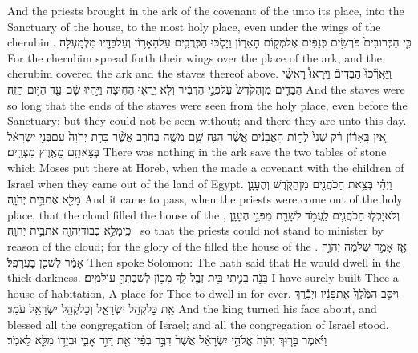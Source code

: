 {And the priests brought in the ark of the covenant of the \lord\space unto its place, into the Sanctuary of the house, to the most holy place, even under the wings of the cherubim.}
{כִּ֤י הַכְּרוּבִים֙ פֹּרְשִׂ֣ים כְּנָפַ֔יִם אֶל\maqqaf מְק֖וֹם הָאָר֑וֹן וַיָּסֹ֧כּוּ הַכְּרֻבִ֛ים עַל\maqqaf הָאָר֥וֹן וְעַל\maqqaf בַּדָּ֖יו מִלְמָֽעְלָה׃}
{For the cherubim spread forth their wings over the place of the ark, and the cherubim covered the ark and the staves thereof above.}
{וַֽיַּאֲרִ֘כוּ֮ הַבַּדִּים֒ וַיֵּֽרָאוּ֩ רָאשֵׁ֨י הַבַּדִּ֤ים מִן\maqqaf הַקֹּ֙דֶשׁ֙ עַל\maqqaf פְּנֵ֣י הַדְּבִ֔יר וְלֹ֥א יֵרָא֖וּ הַח֑וּצָה וַיִּ֣הְיוּ שָׁ֔ם עַ֖ד הַיּ֥וֹם הַזֶּֽה׃}
{And the staves were so long that the ends of the staves were seen from the holy place, even before the Sanctuary; but they could not be seen without; and there they are unto this day.}
{אֵ֚ין בָּֽאָר֔וֹן רַ֗ק שְׁנֵי֙ לֻח֣וֹת הָאֲבָנִ֔ים אֲשֶׁ֨ר הִנִּ֥חַ שָׁ֛ם מֹשֶׁ֖ה בְּחֹרֵ֑ב אֲשֶׁ֨ר כָּרַ֤ת יְהֹוָה֙ עִם\maqqaf בְּנֵ֣י יִשְׂרָאֵ֔ל בְּצֵאתָ֖ם מֵאֶ֥רֶץ מִצְרָֽיִם׃}
{There was nothing in the ark save the two tables of stone which Moses put there at Horeb, when the \lord\space made a covenant with the children of Israel when they came out of the land of Egypt.}
{וַיְהִ֕י בְּצֵ֥את הַכֹּהֲנִ֖ים מִן\maqqaf הַקֹּ֑דֶשׁ וְהֶעָנָ֥ן מָלֵ֖א אֶת\maqqaf בֵּ֥ית יְהֹוָֽה׃}
{And it came to pass, when the priests were come out of the holy place, that the cloud filled the house of the \lord,}
{וְלֹא\maqqaf יָכְל֧וּ הַכֹּהֲנִ֛ים לַֽעֲמֹ֥ד לְשָׁרֵ֖ת מִפְּנֵ֣י הֶעָנָ֑ן כִּֽי\maqqaf מָלֵ֥א כְבוֹד\maqqaf יְהֹוָ֖ה אֶת\maqqaf בֵּ֥ית יְהֹוָֽה׃ \petucha }
{so that the priests could not stand to minister by reason of the cloud; for the glory of the \lord\space filled the house of the \lord.}
{אָ֖ז אָמַ֣ר שְׁלֹמֹ֑ה יְהֹוָ֣ה אָמַ֔ר לִשְׁכֹּ֖ן בָּעֲרָפֶֽל׃}
{Then spoke Solomon: The \lord\space hath said that He would dwell in the thick darkness.}
{בָּנֹ֥ה בָנִ֛יתִי בֵּ֥ית זְבֻ֖ל לָ֑ךְ מָכ֥וֹן לְשִׁבְתְּךָ֖ עוֹלָמִֽים׃}
{I have surely built Thee a house of habitation, A place for Thee to dwell in for ever.}
{וַיַּסֵּ֤ב הַמֶּ֙לֶךְ֙ אֶת\maqqaf פָּנָ֔יו וַיְבָ֕רֶךְ אֵ֖ת כׇּל\maqqaf קְהַ֣ל יִשְׂרָאֵ֑ל וְכׇל\maqqaf קְהַ֥ל יִשְׂרָאֵ֖ל עֹמֵֽד׃}
{And the king turned his face about, and blessed all the congregation of Israel; and all the congregation of Israel stood.}
{וַיֹּ֗אמֶר בָּר֤וּךְ יְהֹוָה֙ אֱלֹהֵ֣י יִשְׂרָאֵ֔ל אֲשֶׁר֙ דִּבֶּ֣ר בְּפִ֔יו אֵ֖ת דָּוִ֣ד אָבִ֑י וּבְיָד֥וֹ מִלֵּ֖א לֵאמֹֽר׃}
